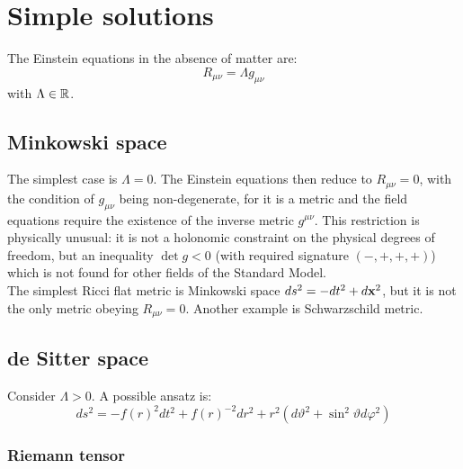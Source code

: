 \section{Simple solutions}

The Einstein equations in the absence of matter are:
\begin{equation*}
  R_{\mu \nu} = \Lambda g_{\mu \nu}
\end{equation*}
with $ \Lambda \in \mathbb{R} $.

\subsection{Minkowski space}

The simplest case is $ \Lambda = 0 $. The Einstein equations then reduce to $ R_{\mu \nu} = 0 $, with the condition of $ g_{\mu \nu} $ being non-degenerate, for it is a metric and the field equations require the existence of the inverse metric $ g^{\mu \nu} $. This restriction is physically unusual: it is not a holonomic constraint on the physical degrees of freedom, but an inequality $ \det g < 0 $ (with required signature $ (-,+,+,+) $) which is not found for other fields of the Standard Model.\\
The simplest Ricci flat metric is Minkowski space $ ds^2 = -dt^2 + d\mathbf{x}^2 $, but it is not the only metric obeying $ R_{\mu \nu} = 0 $. Another example is Schwarzschild metric.

\subsection{de Sitter space}

Consider $ \Lambda > 0 $. A possible ansatz is:
\begin{equation*}
  ds^2 = - f(r)^2 dt^2 + f(r)^{-2} dr^2 + r^2 (d\vartheta^2 + \sin^2 \vartheta d\varphi^2)
\end{equation*}

\subsubsection{Riemann tensor}


